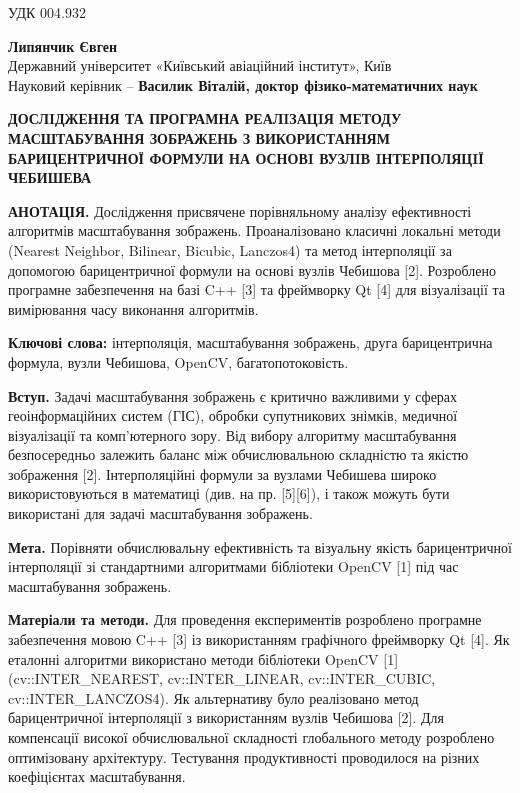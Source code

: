	\noindent УДК 004.932 

\vspace{0.5em}
\noindent \textbf{Липянчик Євген} \\
Державний університет «Київський авіаційний інститут», Київ \\
Науковий керівник – \textbf{Василик Віталій, доктор фізико-математичних наук}

\vspace{1em}
\begin{center}
	\textbf{ДОСЛIДЖЕННЯ ТА ПРОГРАМНА РЕАЛIЗАЦIЯ МЕТОДУ МАСШТАБУВАННЯ
		ЗОБРАЖЕНЬ З ВИКОРИСТАННЯМ БАРИЦЕНТРИЧНОЇ ФОРМУЛИ НА ОСНОВI
		ВУЗЛIВ IНТЕРПОЛЯЦIЇ ЧЕБИШЕВА}
\end{center}

\vspace{0.5em}
\noindent \textbf{АНОТАЦІЯ.} Дослідження присвячене порівняльному аналізу ефективності алгоритмів масштабування зображень. Проаналізовано класичні локальні методи (Nearest Neighbor, Bilinear, Bicubic, Lanczos4) та метод інтерполяції за допомогою барицентричної формули на основі вузлів Чебишова [2]. Розроблено програмне забезпечення на базі C++ [3] та фреймворку Qt [4] для візуалізації та вимірювання часу виконання алгоритмів.

\noindent \textbf{Ключові слова:} інтерполяція, масштабування зображень, друга барицентрична формула, вузли Чебишова, OpenCV, багатопотоковість.

\textbf{Вступ.} Задачі масштабування зображень є критично важливими у сферах геоінформаційних систем (ГІС), обробки супутникових знімків, медичної візуалізації та комп'ютерного зору. Від вибору алгоритму масштабування безпосередньо залежить баланс між обчислювальною складністю та якістю зображення [2]. Інтерполяційні формули за вузлами Чебишева широко використовуються в математиці (див. на пр. [5][6]), і також можуть бути використані для задачі масштабування зображень.

\textbf{Мета.} Порівняти обчислювальну ефективність та візуальну якість барицентричної інтерполяції зі стандартними алгоритмами бібліотеки OpenCV [1] під час масштабування зображень.

\textbf{Матеріали та методи.} Для проведення експериментів розроблено програмне забезпечення мовою C++ [3] із використанням графічного фреймворку Qt [4]. Як еталонні алгоритми використано методи бібліотеки OpenCV [1] (cv::INTER\_NEAREST, \allowbreak cv::INTER\_LINEAR, \allowbreak cv::INTER\_CUBIC, \allowbreak cv::INTER\_LANCZOS4). Як альтернативу було реалізовано метод барицентричної інтерполяції з використанням вузлів Чебишова [2]. Для компенсації високої обчислювальної складності глобального методу розроблено оптимізовану архітектуру. Тестування продуктивності проводилося на різних коефіцієнтах масштабування.

